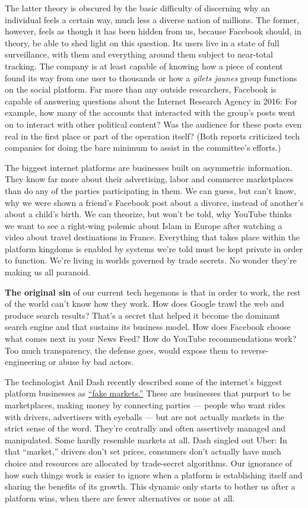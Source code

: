 The latter theory is obscured by the basic difficulty of discerning why
an individual feels a certain way, much less a diverse nation of
millions. The former, however, feels as though it has been hidden from
us, because Facebook should, in theory, be able to shed light on this
question. Its users live in a state of full surveillance, with them and
everything around them subject to near-total tracking. The company is at
least capable of knowing how a piece of content found its way from one
user to thousands or how a \emph{gilets jaunes} group functions on the
social platform. Far more than any outside researchers, Facebook is
capable of answering questions about the Internet Research Agency in
2016: For example, how many of the accounts that interacted with the
group's posts went on to interact with other political content? Was the
audience for these posts even real in the first place or part of the
operation itself? (Both reports criticized tech companies for doing the
bare minimum to assist in the committee's efforts.)

The biggest internet platforms are businesses built on asymmetric
information. They know far more about their advertising, labor and
commerce marketplaces than do any of the parties participating in them.
We can guess, but can't know, why we were shown a friend's Facebook post
about a divorce, instead of another's about a child's birth. We can
theorize, but won't be told, why YouTube thinks we want to see a
right-wing polemic about Islam in Europe after watching a video about
travel destinations in France. Everything that takes place within the
platform kingdoms is enabled by systems we're told must be kept private
in order to function. We're living in worlds governed by trade secrets.
No wonder they're making us all paranoid.

\textbf{The original sin} of our current tech hegemons is that in order
to work, the rest of the world can't know how they work. How does Google
trawl the web and produce search results? That's a secret that helped it
become the dominant search engine and that sustains its business model.
How does Facebook choose what comes next in your News Feed? How do
YouTube recommendations work? Too much transparency, the defense goes,
would expose them to reverse-engineering or abuse by bad actors.

The technologist Anil Dash recently described some of the internet's
biggest platform businesses as
\href{https://medium.com/humane-tech/tech-and-the-fake-market-tactic-8bd386e3d382}{``fake
markets.''} These are businesses that purport to be marketplaces, making
money by connecting parties --- people who want rides with drivers,
advertisers with eyeballs --- but are not actually markets in the strict
sense of the word. They're centrally and often assertively managed and
manipulated. Some hardly resemble markets at all. Dash singled out Uber:
In that ``market,'' drivers don't set prices, consumers don't actually
have much choice and resources are allocated by trade-secret algorithms.
Our ignorance of how such things work is easier to ignore when a
platform is establishing itself and sharing the benefits of its growth.
This dynamic only starts to bother us after a platform wins, when there
are fewer alternatives or none at all.

